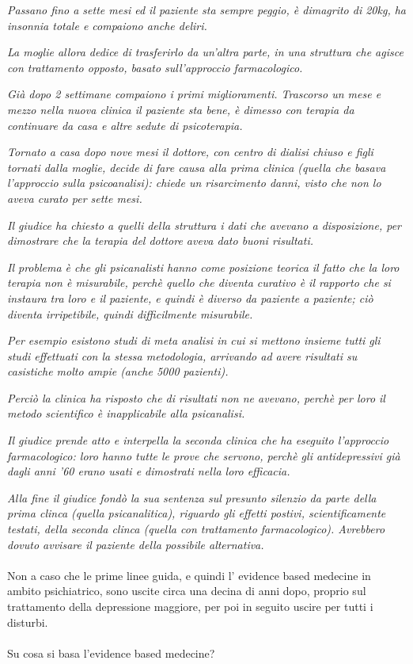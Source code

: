 \emph{Passano fino a sette mesi ed il paziente sta sempre peggio, è
dimagrito di 20kg, ha insonnia totale e compaiono anche deliri.}

\emph{La moglie allora dedice di trasferirlo da un'altra parte, in una
struttura che agisce con trattamento opposto, basato sull'approccio
farmacologico.}

\emph{Già dopo 2 settimane compaiono i primi miglioramenti. Trascorso un
mese e mezzo nella nuova clinica il paziente sta bene, è dimesso con
terapia da continuare da casa e altre sedute di psicoterapia.}

\emph{Tornato a casa dopo nove mesi il dottore, con centro di dialisi
chiuso e figli tornati dalla moglie, decide di fare causa alla prima
clinica (quella che basava l'approccio sulla psicoanalisi): chiede un
risarcimento danni, visto che non lo aveva curato per sette mesi.}

\emph{Il giudice ha chiesto a quelli della struttura i dati che avevano
a disposizione, per dimostrare che la terapia del dottore aveva dato
buoni risultati.}

\emph{Il problema è che gli psicanalisti hanno come posizione teorica il
fatto che la loro terapia non è misurabile, perchè quello che diventa
curativo è il rapporto che si instaura tra loro e il paziente, e quindi
è diverso da paziente a paziente; ciò diventa irripetibile, quindi
difficilmente misurabile.}

\emph{Per esempio esistono studi di meta analisi in cui si mettono
insieme tutti gli studi effettuati con la stessa metodologia, arrivando
ad avere risultati su casistiche molto ampie (anche 5000 pazienti).}

\emph{Perciò la clinica ha risposto che di risultati non ne avevano,
perchè per loro il metodo scientifico è inapplicabile alla psicanalisi.}

\emph{Il giudice prende atto e interpella la seconda clinica che ha
eseguito l'approccio farmacologico: loro hanno tutte le prove che
servono, perchè gli antidepressivi già dagli anni '60 erano usati e
dimostrati nella loro efficacia.}

\emph{Alla fine il giudice fondò la sua sentenza sul presunto silenzio
da parte della prima clinca (quella psicanalitica), riguardo gli effetti
postivi, scientificamente testati, della seconda clinca (quella con
trattamento farmacologico). Avrebbero dovuto avvisare il paziente della
possibile alternativa.}
\\\\
Non a caso che le prime linee guida, e quindi l' evidence based medecine
in ambito psichiatrico, sono uscite circa una decina di anni dopo,
proprio sul trattamento della depressione maggiore, per poi in seguito
uscire per tutti i disturbi.
\\\\
Su cosa si basa l'evidence based medecine?

